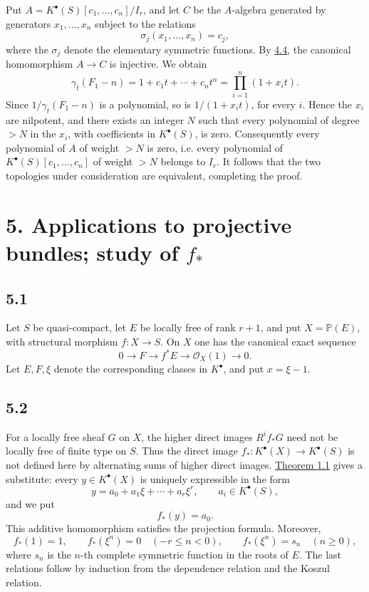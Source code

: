Put \(A=K^\bullet(S)[c_1,\ldots,c_n]/I_r\), and let \(C\) be the \(A\)-algebra generated by generators \(x_1,\ldots,x_n\) subject to the relations
\[
  \sigma_j(x_1,\ldots,x_n)=c_j,
\]
where the \(\sigma_j\) denote the elementary symmetric functions. By \hyperlink{sga6.e06.cor.4-4}{4.4}, the canonical homomorphism \(A\to C\) is injective. We obtain
\[
  \gamma_t(F_1-n)
  =1+c_1t+\cdots+c_nt^n
  =\prod_{i=1}^n(1+x_it).
\]
Since \(1/\gamma_t(F_1-n)\) is a polynomial, so is \(1/(1+x_it)\), for every \(i\). Hence the \(x_i\) are nilpotent, and there exists an integer \(N\) such that every polynomial of degree \(>N\) in the \(x_i\), with coefficients in \(K^\bullet(S)\), is zero. Consequently every polynomial of \(A\) of weight \(>N\) is zero, i.e. every polynomial of \(K^\bullet(S)[c_1,\ldots,c_n]\) of weight \(>N\) belongs to \(I_r\). It follows that the two topologies under consideration are equivalent, completing the proof.

\section*{5. Applications to projective bundles; study of \(f_*\)}

\subsection*{5.1}
Let \(S\) be quasi-compact, let \(E\) be locally free of rank \(r+1\), and put \(X=\mathbb P(E)\), with structural morphism \(f:X\to S\). On \(X\) one has the canonical exact sequence
\[
  0\longrightarrow F\longrightarrow f^*E\longrightarrow \mathcal O_X(1)\longrightarrow 0.
\]
Let \(E,F,\xi\) denote the corresponding classes in \(K^\bullet\), and put \(x=\xi-1\).

\subsection*{5.2}
For a locally free sheaf \(G\) on \(X\), the higher direct images \(R^if_*G\) need not be locally free of finite type on \(S\). Thus the direct image \(f_*:K^\bullet(X)\to K^\bullet(S)\) is not defined here by alternating sums of higher direct images. \hyperlink{sga6.e06.thm.1-1}{Theorem 1.1} gives a substitute: every \(y\in K^\bullet(X)\) is uniquely expressible in the form
\[
  y=a_0+a_1\xi+\cdots+a_r\xi^r,
  \qquad a_i\in K^\bullet(S),
\]
and we put
\[
  f_*(y)=a_0.
\]
This additive homomorphism satisfies the projection formula. Moreover,
\[
  f_*(1)=1,
  \qquad
  f_*(\xi^n)=0\quad(-r\leq n<0),
  \qquad
  f_*(\xi^n)=s_n\quad(n\geq 0),
\]
where \(s_n\) is the \(n\)-th complete symmetric function in the roots of \(E\). The last relations follow by induction from the dependence relation and the Koszul relation.

